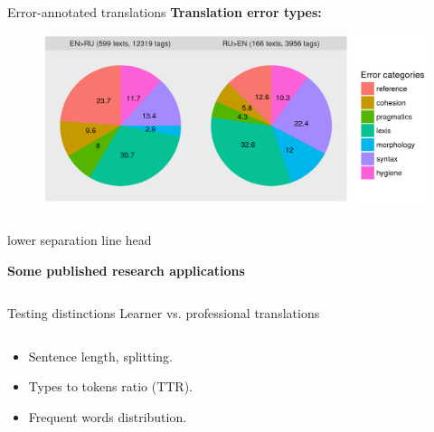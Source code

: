 \documentclass{beamer}
\begin{document}
\begin{frame}[fragile]
\begin{columns}[T]
\begin{column}{.4\textwidth}
\begin{block}{Error-annotated translations}
\textbf{Translation error types:}
\begin{figure}
    \includegraphics[width=0.7\linewidth,keepaspectratio]{images/error.png}
\end{figure}
\end{block}

\end{column}
\end{columns}

  \begin{beamercolorbox}[wd=\paperwidth]{lower separation line head}
  	\rule{0pt}{0.2em}
  \end{beamercolorbox}
\centering
\Large{\textbf{\textcolor{Zen}{Some published research applications}}}

\small{\begin{columns}
	\vspace{4em}	
	\begin{column}{.32\linewidth}
		\begin{block}{Testing distinctions}
				\alert{Learner vs. professional translations}
	\begin{columns}
		\hspace{.5em}
		\begin{column}{.5\linewidth}
		
				\begin{itemize}
					\item Sentence length, splitting.
					\item Types to tokens ratio (TTR).
					\item Frequent words distribution.
				

\end{itemize}
\end{column}
\end{columns}
\end{block}
\end{column}
\end{columns}}
\end{frame}
\end{document}
